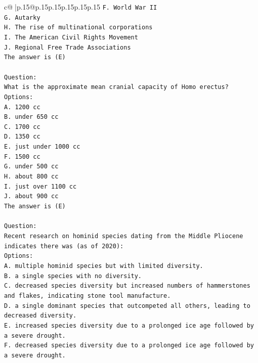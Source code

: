 \documentclass{article}
\begin{document}
{\begin{supertabular}{c@{$\;$}|p{.15\linewidth}@{}p{.15\linewidth}p{.15\linewidth}p{.15\linewidth}p{.15\linewidth}p{.15\linewidth}}
{{{\texttt{F. World War II} \\
\texttt{G. Autarky} \\
\texttt{H. The rise of multinational corporations} \\
\texttt{I. The American Civil Rights Movement} \\
\texttt{J. Regional Free Trade Associations} \\
\texttt{The answer is (E)} \\
\\ 
\texttt{Question:} \\
\texttt{What is the approximate mean cranial capacity of Homo erectus?} \\
\texttt{Options:} \\
\texttt{A. 1200 cc} \\
\texttt{B. under 650 cc} \\
\texttt{C. 1700 cc} \\
\texttt{D. 1350 cc} \\
\texttt{E. just under 1000 cc} \\
\texttt{F. 1500 cc} \\
\texttt{G. under 500 cc} \\
\texttt{H. about 800 cc} \\
\texttt{I. just over 1100 cc} \\
\texttt{J. about 900 cc} \\
\texttt{The answer is (E)} \\
\\ 
\texttt{Question:} \\
\texttt{Recent research on hominid species dating from the Middle Pliocene indicates there was (as of 2020):} \\
\texttt{Options:} \\
\texttt{A. multiple hominid species but with limited diversity.} \\
\texttt{B. a single species with no diversity.} \\
\texttt{C. decreased species diversity but increased numbers of hammerstones and flakes, indicating stone tool manufacture.} \\
\texttt{D. a single dominant species that outcompeted all others, leading to decreased diversity.} \\
\texttt{E. increased species diversity due to a prolonged ice age followed by a severe drought.} \\
\texttt{F. decreased species diversity due to a prolonged ice age followed by a severe drought.} \\
}}}
\end{supertabular}}
\end{document}
